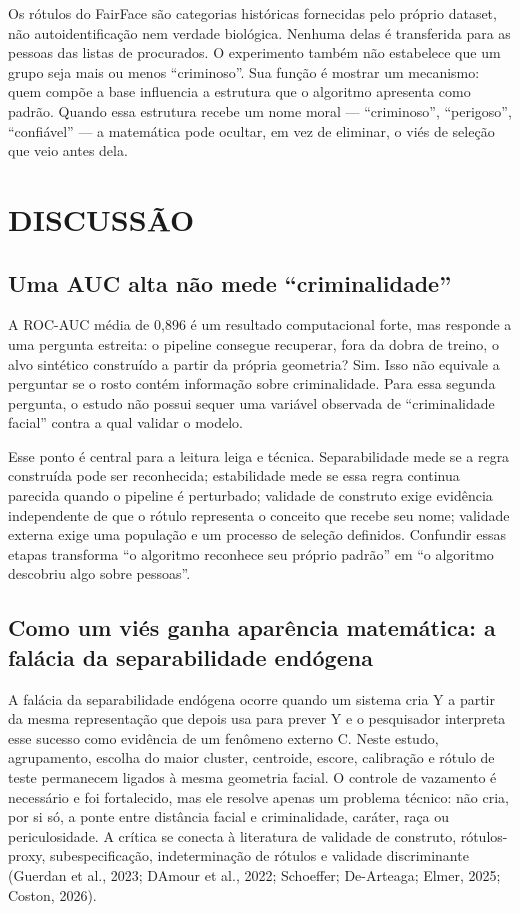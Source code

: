 Os rótulos do FairFace são categorias históricas fornecidas pelo próprio dataset, não autoidentificação nem verdade biológica. Nenhuma delas é transferida para as pessoas das listas de procurados. O experimento também não estabelece que um grupo seja mais ou menos ``criminoso''. Sua função é mostrar um mecanismo: quem compõe a base influencia a estrutura que o algoritmo apresenta como padrão. Quando essa estrutura recebe um nome moral --- ``criminoso'', ``perigoso'', ``confiável'' --- a matemática pode ocultar, em vez de eliminar, o viés de seleção que veio antes dela.

\chapter{DISCUSSÃO}

\section{Uma AUC alta não mede ``criminalidade''}

A ROC-AUC média de 0,896 é um resultado computacional forte, mas responde a uma pergunta estreita: o pipeline consegue recuperar, fora da dobra de treino, o alvo sintético construído a partir da própria geometria? Sim. Isso não equivale a perguntar se o rosto contém informação sobre criminalidade. Para essa segunda pergunta, o estudo não possui sequer uma variável observada de ``criminalidade facial'' contra a qual validar o modelo.

Esse ponto é central para a leitura leiga e técnica. Separabilidade mede se a regra construída pode ser reconhecida; estabilidade mede se essa regra continua parecida quando o pipeline é perturbado; validade de construto exige evidência independente de que o rótulo representa o conceito que recebe seu nome; validade externa exige uma população e um processo de seleção definidos. Confundir essas etapas transforma ``o algoritmo reconhece seu próprio padrão'' em ``o algoritmo descobriu algo sobre pessoas''.

\section{Como um viés ganha aparência matemática: a falácia da separabilidade endógena}

A falácia da separabilidade endógena ocorre quando um sistema cria Y a partir da mesma representação que depois usa para prever Y e o pesquisador interpreta esse sucesso como evidência de um fenômeno externo C. Neste estudo, agrupamento, escolha do maior cluster, centroide, escore, calibração e rótulo de teste permanecem ligados à mesma geometria facial. O controle de vazamento é necessário e foi fortalecido, mas ele resolve apenas um problema técnico: não cria, por si só, a ponte entre distância facial e criminalidade, caráter, raça ou periculosidade. A crítica se conecta à literatura de validade de construto, rótulos-proxy, subespecificação, indeterminação de rótulos e validade discriminante (Guerdan et al., 2023; D\textquotesingle Amour et al., 2022; Schoeffer; De-Arteaga; Elmer, 2025; Coston, 2026).

